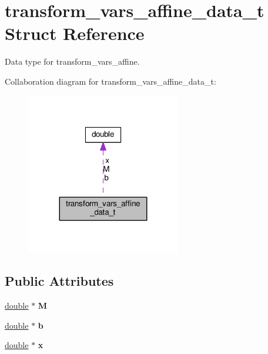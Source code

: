 \hypertarget{structtransform__vars__affine__data__t}{}\section{transform\+\_\+vars\+\_\+affine\+\_\+data\+\_\+t Struct Reference}
\label{structtransform__vars__affine__data__t}


Data type for transform\+\_\+vars\+\_\+affine.  




Collaboration diagram for transform\+\_\+vars\+\_\+affine\+\_\+data\+\_\+t\+:\nopagebreak
\begin{figure}[H]
\begin{center}
\leavevmode
\includegraphics[width=191pt]{structtransform__vars__affine__data__t__coll__graph}
\end{center}
\end{figure}
\subsection*{Public Attributes}
\begin{DoxyCompactItemize}
\item 
\hyperlink{classdouble}{double} $\ast$ {\bfseries M}\hypertarget{structtransform__vars__affine__data__t_ae548a7dccaeecd3377e142c1f11f8954}{}\label{structtransform__vars__affine__data__t_ae548a7dccaeecd3377e142c1f11f8954}

\item 
\hyperlink{classdouble}{double} $\ast$ {\bfseries b}\hypertarget{structtransform__vars__affine__data__t_ac6a7be4020500a5562b4c7e6f0a981eb}{}\label{structtransform__vars__affine__data__t_ac6a7be4020500a5562b4c7e6f0a981eb}

\item 
\hyperlink{classdouble}{double} $\ast$ {\bfseries x}\hypertarget{structtransform__vars__affine__data__t_acf864fdd7fe3b05a1e7a85055ed8a482}{}\label{structtransform__vars__affine__data__t_acf864fdd7fe3b05a1e7a85055ed8a482}

\end{DoxyCompactItemize}


